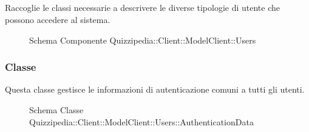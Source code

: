 \subsection{}
Raccoglie le classi necessarie a descrivere le diverse tipologie di utente che possono accedere al sistema.
\begin{figure}[H]
\centering
\noindent{}
\caption[Schema Componente Quizzipedia::Client::ModelClient::Users]{Schema Componente Quizzipedia::Client::ModelClient::Users}
\end{figure}
\subsubsection{Classe }
Questa classe gestisce le informazioni di autenticazione comuni a tutti gli utenti.
\begin{figure}[H]
\centering
\noindent{}
\caption[Schema Classe AuthenticationData]{Schema Classe Quizzipedia::Client::ModelClient::Users::AuthenticationData}
\end{figure}
